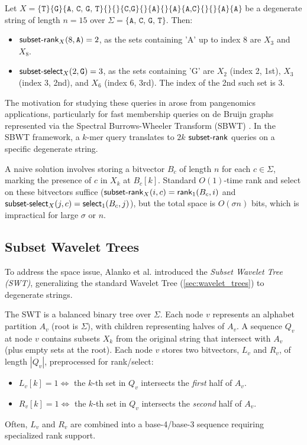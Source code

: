 \begin{example}
    Let $X = \{\texttt{T}\} \{\texttt{G}\} \{\texttt{A, C, G, T}\} \{\} \{\} \{\texttt{C,G}\} \{\} \{\texttt{A}\} \{\} \{\texttt{A}\} \{\texttt{A,C}\} \{\} \{\} \{\texttt{A}\} \{\texttt{A}\}$ be a degenerate string of length $n=15$ over $\Sigma = \{\texttt{A, C, G, T}\}$. Then:
    \begin{itemize}
        \item $\textsf{subset-rank}_X(8, \texttt{A}) = 2$, as the sets containing 'A' up to index 8 are $X_3$ and $X_8$.
        \item $\textsf{subset-select}_X(2, \texttt{G}) = 3$, as the sets containing 'G' are $X_2$ (index 2, 1st), $X_3$ (index 3, 2nd), and $X_6$ (index 6, 3rd). The index of the 2nd such set is 3.
    \end{itemize}
\end{example}

The motivation for studying these queries in \cite{SubsetWT} arose from pangenomics applications, particularly for fast membership queries on de Bruijn graphs represented via the Spectral Burrows-Wheeler Transform (SBWT) \cite{alanko2023small}. In the SBWT framework, a $k$-mer query translates to $2k$ $\textsf{subset-rank}$ queries on a specific degenerate string.

A naive solution involves storing a bitvector $B_c$ of length $n$ for each $c \in \Sigma$, marking the presence of $c$ in $X_k$ at $B_c[k]$. Standard $O(1)$-time \textsf{rank} and \textsf{select} on these bitvectors suffice ($\textsf{subset-rank}_X(i, c) = \textsf{rank}_1(B_c, i)$ and $\textsf{subset-select}_X(j, c) = \textsf{select}_1(B_c, j)$), but the total space is $O(\sigma n)$ bits, which is impractical for large $\sigma$ or $n$.

\subsection{Subset Wavelet Trees}

To address the space issue, Alanko et al. \cite{SubsetWT} introduced the \emph{Subset Wavelet Tree (SWT)}, generalizing the standard Wavelet Tree (\autoref{sec:wavelet_trees}) to degenerate strings.

The SWT is a balanced binary tree over $\Sigma$. Each node $v$ represents an alphabet partition $A_v$ (root is $\Sigma$), with children representing halves of $A_v$. A sequence $Q_v$ at node $v$ contains subsets $X_k$ from the original string that intersect with $A_v$ (plus empty sets at the root). Each node $v$ stores two bitvectors, $L_v$ and $R_v$, of length $|Q_v|$, preprocessed for rank/select:
\begin{itemize}
    \item $L_v[k] = 1 \iff$ the $k$-th set in $Q_v$ intersects the \emph{first} half of $A_v$.
    \item $R_v[k] = 1 \iff$ the $k$-th set in $Q_v$ intersects the \emph{second} half of $A_v$.
\end{itemize}
Often, $L_v$ and $R_v$ are combined into a base-4/base-3 sequence requiring specialized rank support.

